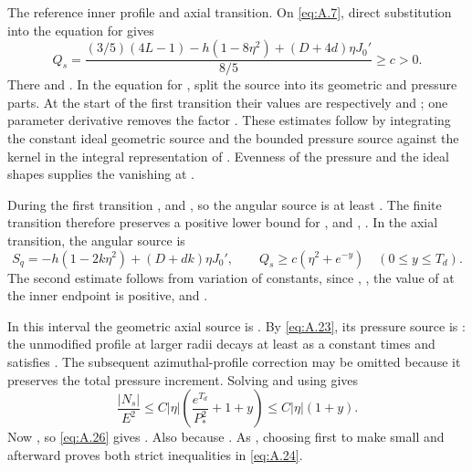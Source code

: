 The reference inner profile and axial transition. On \eqref{eq:A.7}, direct substitution into
the equation for  gives
\begin{equation}
 Q_s=\frac{(3/5)(4L-1)-h(1-8\eta^2)+(D+4d)\eta J_0'}{8/5}\geq c>0.
 \tag{A.25}\label{eq:A.25}
\end{equation}
There  and . In the equation for
, split the source into its geometric and pressure parts. At the start
of the first transition their values are respectively  and
; one parameter derivative removes the factor
. These estimates follow by integrating the constant ideal
geometric source and the bounded pressure source against the
%
kernel in the integral representation of . Evenness of the pressure
and the ideal shapes supplies the vanishing at .

During the first transition ,
 and , so the angular source is at
least . The finite transition therefore preserves a positive lower
bound for , and ,
. In the axial transition, the angular source
 is
\begin{equation}
 S_q=-h(1-2k\eta^2)+(D+dk)\eta J_0',\qquad
 Q_s\geq c(\eta^2+e^{-y})\quad(0\leq y\leq T_d).
 \tag{A.26}\label{eq:A.26}
\end{equation}
The second estimate follows from variation of constants, since
, , the value of
 at the inner endpoint is positive, and
.

In this interval the geometric axial source is . By
\eqref{eq:A.23}, its pressure source is : the unmodified
profile at larger radii decays at least as a constant times
 and satisfies
. The subsequent azimuthal-profile
correction may be omitted because it preserves the total pressure increment. Solving
 and using
 gives
\[
 \frac{|N_s|}{E^2}\leq C|\eta|
 \left(\frac{e^{T_d}}{P_*^2}+1+y\right)\leq C|\eta|(1+y).
\]
Now , so \eqref{eq:A.26} gives
. Also  because
. As , choosing
 first to make  small and
 afterward proves both strict inequalities in \eqref{eq:A.24}.

